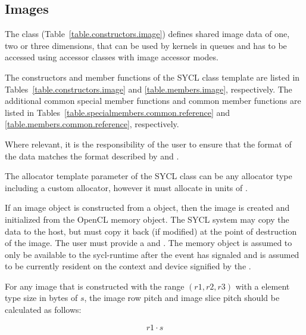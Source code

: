 


\subsection{Images}
\label{subsec:images}

The class 
(Table~\ref{table.constructors.image}) defines shared image data of one,
two or three dimensions, that can be used by kernels in queues and has to
be accessed using \gls{accessor} classes with image accessor modes.

The constructors and member functions of the SYCL  class template are listed in Tables~\ref{table.constructors.image} and \ref{table.members.image}, respectively. The additional common special member functions and common member functions are listed in Tables~\ref{table.specialmembers.common.reference} and \ref{table.members.common.reference}, respectively.

Where relevant, it is the
responsibility of the user to ensure that the format of the data
matches the format described by
 and .

The allocator template parameter of the SYCL  class can be any allocator type including a custom allocator, however it must allocate in units of .

If an image object is constructed from a  object,
then the image is created and initialized from the OpenCL memory
object. The SYCL system may copy the data to the host, but must copy
it back (if modified) at the point of destruction of the image.
The user must provide a  and
. The memory object is assumed to only be available to the
\gls{sycl-runtime} after the event has signaled and is assumed to be
currently resident on the context and device signified by the
.

For any image that is constructed with the range $(r1, r2, r3)$ with a element
type size in bytes of $s$, the image row pitch and image slice pitch should be
calculated as follows:

\begin{equation}
\label{image-row-pitch}
 r1 \cdot s
\end{equation}

